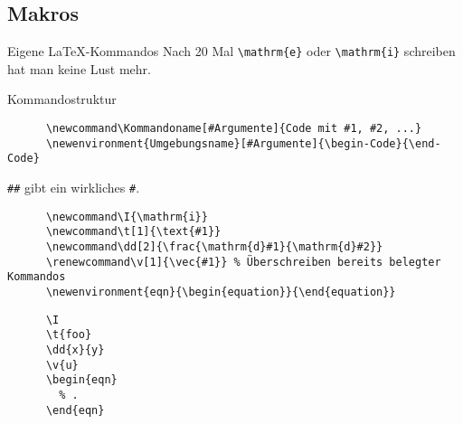 \subsection{Makros}

\begin{frame}[fragile]{Eigene \LaTeX-Kommandos}
  Nach 20 Mal \lstinline+\mathrm{e}+ oder \lstinline+\mathrm{i}+ schreiben hat man keine Lust mehr.
  \begin{block}{Kommandostruktur}
    \begin{lstlisting}
      \newcommand\Kommandoname[#Argumente]{Code mit #1, #2, ...}
      \newenvironment{Umgebungsname}[#Argumente]{\begin-Code}{\end-Code}
    \end{lstlisting}
  \end{block}
  \verb+##+ gibt ein wirkliches \verb+#+.
  \begin{CodeExample}{0.75}
    \begin{lstlisting}
      \newcommand\I{\mathrm{i}}
      \newcommand\t[1]{\text{#1}}
      \newcommand\dd[2]{\frac{\mathrm{d}#1}{\mathrm{d}#2}}
      \renewcommand\v[1]{\vec{#1}} % Überschreiben bereits belegter Kommandos
      \newenvironment{eqn}{\begin{equation}}{\end{equation}}
    \end{lstlisting}
  \CodeResult
    \begin{lstlisting}
      \I
      \t{foo}
      \dd{x}{y}
      \v{u}
      \begin{eqn}
        % .
      \end{eqn}
    \end{lstlisting}
  \end{CodeExample}
\end{frame}


